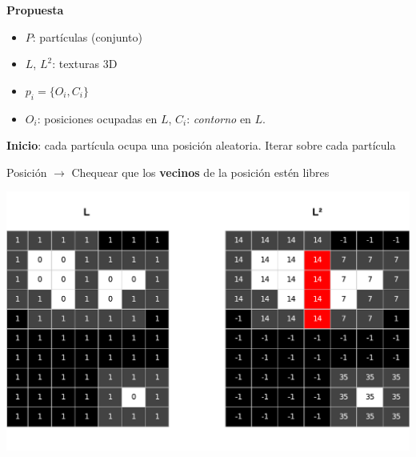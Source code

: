 \documentclass[spanish,unknownkeysallowed,10pt]{beamer}
\begin{document}
\begin{frame}
\textbf{Propuesta}
\begin{itemize}
\item $P$: partículas (conjunto)
\item $L$, $L^{2}$: texturas 3D
\end{itemize}

\begin{itemize}
\item  $p_{i} = \{O_{i}, C_{i}\}$
\end{itemize}

\begin{itemize}
\item $O_{i}$: posiciones ocupadas en $L$, $C_{i}$: {\em contorno} en $L$.
\end{itemize}

\textbf{Inicio}: cada partícula ocupa una posición aleatoria. Iterar sobre cada partícula

Posición $\rightarrow$ Chequear que los \textbf{vecinos} de la posición estén libres

\centerline{\includegraphics[scale = 0.35]{../figures/sistemaparticulas}}

\end{frame}
\end{document}

